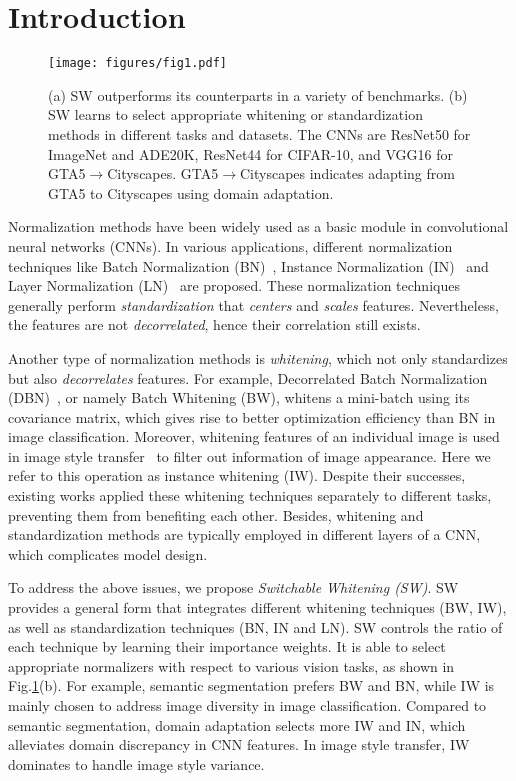 \documentclass[10pt,twocolumn,letterpaper]{article}
\begin{document}
\section{Introduction}

\begin{figure}[!t]
	\centering
	\texttt{[image: figures/fig1.pdf]}
	\vspace{-0.3cm}
	\caption{\label{Fig1} (a) SW outperforms its counterparts in a variety of benchmarks. (b) SW learns to select appropriate whitening or standardization methods in different tasks and datasets. The CNNs are ResNet50 for ImageNet and ADE20K, ResNet44 for CIFAR-10, and VGG16 for GTA5$\rightarrow$Cityscapes.
		GTA5$\rightarrow$Cityscapes indicates adapting from GTA5 to Cityscapes using domain adaptation.} \vspace{-0.3cm}
\end{figure}


Normalization methods have been widely used as a basic module in convolutional neural networks (CNNs).
In various applications, different normalization techniques like Batch Normalization (BN)~\cite{ioffe2015batch}, Instance Normalization (IN)~\cite{ulyanov2017improved} and Layer Normalization (LN)~\cite{ba2016layer} are proposed.
These normalization techniques generally perform \textit{standardization} that \textit{centers} and \textit{scales} features.
Nevertheless, the features are not \textit{decorrelated}, hence their correlation still exists.


Another type of normalization methods is \textit{whitening}, which not only standardizes but also \textit{decorrelates} features. 
For example, Decorrelated Batch Normalization (DBN)~\cite{lei2018decorrelated}, or namely Batch Whitening (BW), whitens a mini-batch using its covariance matrix, which gives rise to better optimization efficiency than BN in image classification.
Moreover, whitening features of an individual image is used in image style transfer~\cite{li2017universal} to filter out information of image appearance.
Here we refer to this operation as instance whitening (IW).
Despite their successes, existing works applied these whitening techniques separately to different tasks, preventing them from benefiting each other.
Besides, whitening and standardization methods are typically employed in different layers of a CNN, which complicates model design.

To address the above issues, we propose \textit{Switchable Whitening (SW)}.
SW provides a general form that integrates different whitening techniques (\eg BW, IW), as well as standardization techniques (\eg BN, IN and LN). SW controls the ratio of each technique by learning their importance weights.
It is able to select appropriate normalizers with respect to various vision tasks, as shown in Fig.\ref{Fig1}(b).
For example, semantic segmentation prefers BW and BN, while IW is mainly chosen to address image diversity in image classification.
Compared to semantic segmentation, domain adaptation selects more IW and IN, which alleviates domain discrepancy in CNN features.
In image style transfer, IW dominates to handle image style variance.
\end{document}
